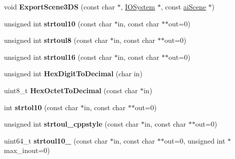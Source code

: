 \begin{DoxyCompactItemize}
\item 
\hypertarget{namespace_assimp_a4d11453b42e35cc6767f25d12008042b}{void {\bfseries Export\+Scene3\+D\+S} (const char $\ast$, \hyperlink{class_assimp_1_1_i_o_system}{I\+O\+System} $\ast$, const \hyperlink{structai_scene}{ai\+Scene} $\ast$)}\label{namespace_assimp_a4d11453b42e35cc6767f25d12008042b}

\item 
\hypertarget{namespace_assimp_a0b34bad3b9ad1b488391ede9b4f23c07}{unsigned int {\bfseries strtoul10} (const char $\ast$in, const char $\ast$$\ast$out=0)}\label{namespace_assimp_a0b34bad3b9ad1b488391ede9b4f23c07}

\item 
\hypertarget{namespace_assimp_a1c1db8ffa6363c57660b3d1d0dc8ed3f}{unsigned int {\bfseries strtoul8} (const char $\ast$in, const char $\ast$$\ast$out=0)}\label{namespace_assimp_a1c1db8ffa6363c57660b3d1d0dc8ed3f}

\item 
\hypertarget{namespace_assimp_a358486ae5448785a4eeb0b6d9ebe929b}{unsigned int {\bfseries strtoul16} (const char $\ast$in, const char $\ast$$\ast$out=0)}\label{namespace_assimp_a358486ae5448785a4eeb0b6d9ebe929b}

\item 
\hypertarget{namespace_assimp_a6bb609222363ab9ba88298597056d65f}{unsigned int {\bfseries Hex\+Digit\+To\+Decimal} (char in)}\label{namespace_assimp_a6bb609222363ab9ba88298597056d65f}

\item 
\hypertarget{namespace_assimp_a50f9e78be9d92b2140273c577d24ff47}{uint8\+\_\+t {\bfseries Hex\+Octet\+To\+Decimal} (const char $\ast$in)}\label{namespace_assimp_a50f9e78be9d92b2140273c577d24ff47}

\item 
\hypertarget{namespace_assimp_a6712580fbbfe4f27e13815abf8e2a0e0}{int {\bfseries strtol10} (const char $\ast$in, const char $\ast$$\ast$out=0)}\label{namespace_assimp_a6712580fbbfe4f27e13815abf8e2a0e0}

\item 
\hypertarget{namespace_assimp_a90b8b671fcfb5f9c2c1be40056cdef27}{unsigned int {\bfseries strtoul\+\_\+cppstyle} (const char $\ast$in, const char $\ast$$\ast$out=0)}\label{namespace_assimp_a90b8b671fcfb5f9c2c1be40056cdef27}

\item 
\hypertarget{namespace_assimp_a591ca644fe029794191b24cb7b7419c5}{uint64\+\_\+t {\bfseries strtoul10\+\_} (const char $\ast$in, const char $\ast$$\ast$out=0, unsigned int $\ast$max\+\_\+inout=0)}\label{namespace_assimp_a591ca644fe029794191b24cb7b7419c5}


\end{DoxyCompactItemize}
